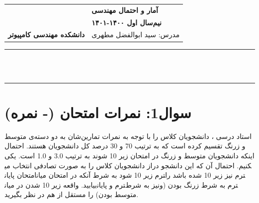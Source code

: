 \documentclass[a4paper,11pt]{article}
\begin{document}
%
%
\begin{tabularx}{\textwidth}{LR}
\hspace{3mm} 
 \vspace{-3mm}& {\Large \textbf{آمار و احتمال مهندسی}} \\
 	& {\textbf{نیم‌سال اول ۱۴۰۰-۱۴۰۱}} \\
\footnotesize{\textbf{دانشکده مهندسی کامپیوتر}} 										& {
مدرس:  سید ابوالفضل مطهری
 }\\
\end{tabularx}

\vspace{5mm}

\rule{\textwidth}{1.4pt}
\\
\vspace{-1mm}
\hfill
{}
\hfill
\vspace{-1mm}
\\
\rule{\textwidth}{1.4pt}

\flushright
\indent

\section*{ 
\textbf {سوال1: نمرات امتحان (- نمره)  }
\\}

استاد درسی ، دانشجویان کلاس را با توجه به نمرات تمارین‌شان به دو دسته‌ی متوسط و زرنگ تقسیم کرده است که به ترتیب 70 و 30 درصد کل دانشجویان هستند. احتمال اینکه دانشجویان متوسط و زرنگ در امتحان زیر 10 شوند به ترتیب 3.0 و 1.0 است. یکی از دانشجویان کلاس را به صورت تصادفی انتخاب می‎کنیم. احتمال آن که این دانشجو در امتحان پایان‎ترم زیر 10 شود به شرط آنکه در امتحان میان‎ترم نیز زیر 10 شده باشد را بیابید. 
واقعه زیر 10 شدن در میان‎ترم و پایان‎ترم به شرط زرنگ بودن (ونیز به شرط متوسط بودن) را مستقل از هم در نظر بگیرید.
\end{document}
